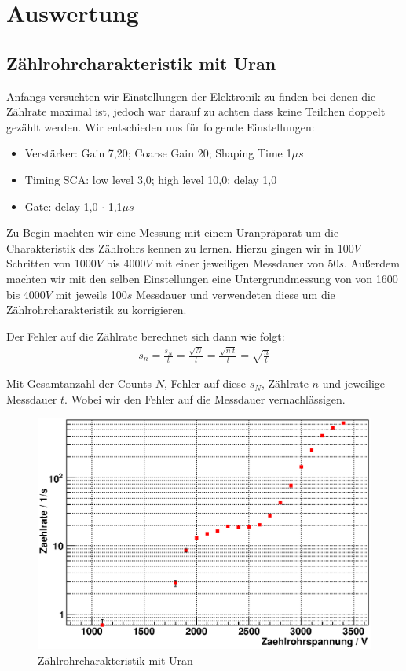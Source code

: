 \documentclass[12pt]{article}
\begin{document}
\section{Auswertung}
\subsection{Zählrohrcharakteristik mit Uran}
Anfangs versuchten wir Einstellungen der Elektronik zu finden bei denen die Zählrate maximal ist, jedoch war darauf zu achten dass keine Teilchen doppelt
gezählt werden. Wir entschieden uns für folgende Einstellungen:
\begin{itemize}
 \item Verstärker: Gain 7,20; Coarse Gain 20; Shaping Time 1$\mu s$
 \item Timing SCA: low level 3,0; high level 10,0; delay 1,0
 \item Gate: delay 1,0 $\cdot$ 1,1$\mu s$
\end{itemize}

Zu Begin machten wir eine Messung mit einem Uranpräparat um die Charakteristik des Zählrohrs kennen zu lernen.
Hierzu gingen wir in 100$V$ Schritten von 1000$V$ bis 4000$V$ mit einer jeweiligen Messdauer von 50$s$.
Außerdem machten wir mit den selben Einstellungen eine Untergrundmessung von von 1600 bis 4000$V$ mit jeweils 100$s$
Messdauer und verwendeten diese um die Zählrohrcharakteristik zu korrigieren.

Der Fehler auf die Zählrate berechnet sich dann wie folgt:
\begin{align}
 s_n = \frac{s_N}{t} = \frac{\sqrt{N}}{t} = \frac{\sqrt{n~t}}{t} = \sqrt{\frac{n}{t}}
\end{align}

Mit Gesamtanzahl der Counts $N$, Fehler auf diese $s_N$, Zählrate $n$ und jeweilige Messdauer $t$. Wobei wir den Fehler auf die Messdauer
vernachlässigen.


\begin{figure}[H]  
\centering
\includegraphics[width=0.9\linewidth]{pictures/char_uran.eps}
\caption{Zählrohrcharakteristik mit Uran}
\end{figure}
\end{document}
